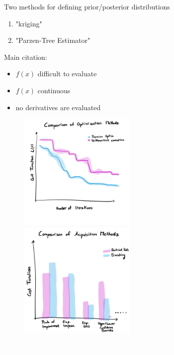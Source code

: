 \documentclass{article}
\newcommand{\todo}[1]{\colorbox{WildStrawberry}{\textcolor{white}{#1}}}
\begin{document}
Two methods for defining prior/posterior distributions
\begin{enumerate}
    \item "kriging"
    \item "Parzen-Tree Estimator"
\end{enumerate}

Main citation: \cite{Jones1998}
\begin{itemize}
    \item $f(x)$ difficult to evaluate
    \item $f(x)$ continuous
    \item no derivatives are evaluated
\end{itemize}

\begin{figure}[H]
    \centering
    \includegraphics[width=0.5\textwidth]{figures/optim-cost-function-temp.jpg}%
    \includegraphics[width=0.5\textwidth]{figures/optim-acquisition-function-comparison.jpg}
    \caption{\todo{caption}}
    \label{fig:optim-comparison-cost-function}
\end{figure}

\end{document}
